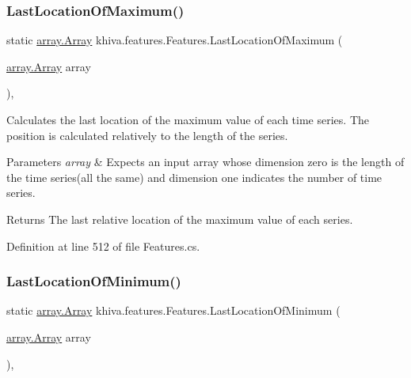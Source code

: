 \subsubsection{\texorpdfstring{Last\+Location\+Of\+Maximum()}{LastLocationOfMaximum()}}
{\footnotesize\ttfamily static \mbox{\hyperlink{classkhiva_1_1array_1_1_array}{array.\+Array}} khiva.\+features.\+Features.\+Last\+Location\+Of\+Maximum (\begin{DoxyParamCaption}\item[{\mbox{\hyperlink{classkhiva_1_1array_1_1_array}{array.\+Array}}}]{array }\end{DoxyParamCaption})\hspace{0.3cm}{\ttfamily [inline]}, {\ttfamily [static]}}



Calculates the last location of the maximum value of each time series. The position is calculated relatively to the length of the series. 


\begin{DoxyParams}{Parameters}
{\em array} & Expects an input array whose dimension zero is the length of the time series(all the same) and dimension one indicates the number of time series.\\
\hline
\end{DoxyParams}
\begin{DoxyReturn}{Returns}
The last relative location of the maximum value of each series.
\end{DoxyReturn}


Definition at line 512 of file Features.\+cs.

\mbox{\label{classkhiva_1_1features_1_1_features_aff001af10442ea2e923bf3d82a201e77}} 
\subsubsection{\texorpdfstring{Last\+Location\+Of\+Minimum()}{LastLocationOfMinimum()}}
{\footnotesize\ttfamily static \mbox{\hyperlink{classkhiva_1_1array_1_1_array}{array.\+Array}} khiva.\+features.\+Features.\+Last\+Location\+Of\+Minimum (\begin{DoxyParamCaption}\item[{\mbox{\hyperlink{classkhiva_1_1array_1_1_array}{array.\+Array}}}]{array }\end{DoxyParamCaption})\hspace{0.3cm}{\ttfamily [inline]}, {\ttfamily [static]}}



